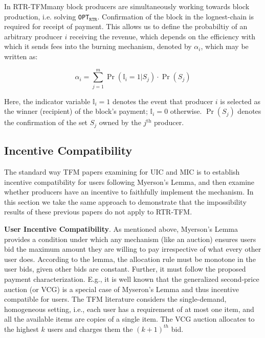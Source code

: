 \documentclass[sigconf,anonymous]{aamas}
\newcommand{\ourTFM}{\textsc{RTR-TFM}}
\renewcommand{\paragraph}[1]{\smallskip\noindent\textbf{#1}}
\newcommand{\ourOPT}{\texttt{OPT$_{\texttt{RTR}}$}}
\begin{document}
In \ourTFM many block producers are simultaneously working towards block production, i.e. solving \ourOPT. Confirmation of the block in the lognest-chain is required for receipt of payment. This allows us to define the probabiltiy of an arbitrary producer $i$ receiving the revenue, which depends on the efficiency with which it sends fees into the burning mechanism, denoted by $\alpha_i$, which may be written as:

\begin{equation}\label{eqn:alphai}
    \alpha_{i} = \sum_{j = 1}^{m} \Pr(\mathbb{I}_{i} = 1 | S_{j})\cdot \Pr(S_{j})
\end{equation}

Here, the indicator variable  $\mathbb{I}_{i} = 1$ denotes the event that producer $i$ is selected as the winner (recipient) of the block's payment; $\mathbb{I}_{i} = 0$ otherwise. $\Pr(S_j)$ denotes the confirmation of the set $S_j$ owned by the $j^{\mbox{th}}$ producer.



\subsection{Incentive Compatibility}

The standard way TFM papers examining for UIC and MIC is to establish incentive compatibility for users following Myerson's Lemma, and then examine whether producers have an incentive to faithfully implement the mechanism. In this section we take the same approach to demonstrate that the impossibility results of these previous papers do not apply to \ourTFM.

\paragraph{User Incentive Compatibility}. As mentioned above, Myerson's Lemma \cite{myerson81} provides a condition under which any mechanism (like an auction) ensures users bid the maximum amount they are willing to pay irrespective of what every other user does. According to the lemma, the allocation rule must be monotone in the user bids, given other bids are constant. Further, it must follow the proposed payment characterization. E.g., it is well known that the generalized second-price auction (or VCG) is a special case of Myseron's Lemma and thus incentive compatible for users. The TFM literature considers the single-demand, homogeneous setting, i.e., each user has a requirement of at most one item, and all the available items are copies of a single item. The VCG auction allocates to the highest $k$ users and charges them the $(k+1)^{th}$ bid. 
 
\end{document}
